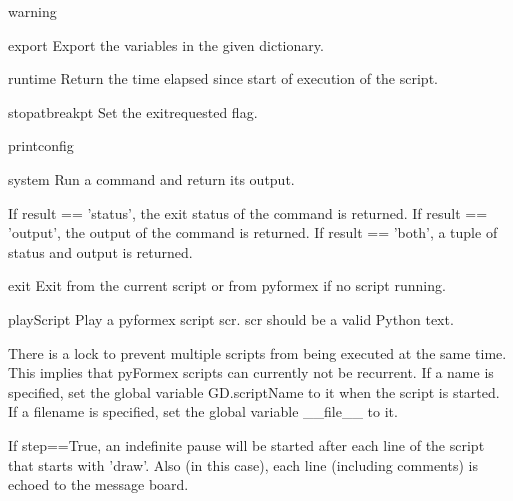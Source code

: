 \begin{funcdesc}{warning}{}


\end{funcdesc}


\begin{funcdesc}{export}{}
Export the variables in the given dictionary.

\end{funcdesc}


\begin{funcdesc}{runtime}{}
Return the time elapsed since start of execution of the script.

\end{funcdesc}


\begin{funcdesc}{stopatbreakpt}{}
Set the exitrequested flag.

\end{funcdesc}


\begin{funcdesc}{printconfig}{}


\end{funcdesc}


\begin{funcdesc}{system}{}
Run a command and return its output.

    If result == 'status', the exit status of the command is returned.
    If result == 'output', the output of the command is returned.
    If result == 'both', a tuple of status and output is returned.
    

\end{funcdesc}


\begin{funcdesc}{exit}{}
Exit from the current script or from pyformex if no script running.

\end{funcdesc}


\begin{funcdesc}{playScript}{}
Play a pyformex script scr. scr should be a valid Python text.

    There is a lock to prevent multiple scripts from being executed at the
    same time. This implies that pyFormex scripts can currently not be
    recurrent.
    If a name is specified, set the global variable GD.scriptName to it
    when the script is started.
    If a filename is specified, set the global variable __file__ to it.
    
    If step==True, an indefinite pause will be started after each line of
    the script that starts with 'draw'. Also (in this case), each line
    (including comments) is echoed to the message board.
    

\end{funcdesc}


